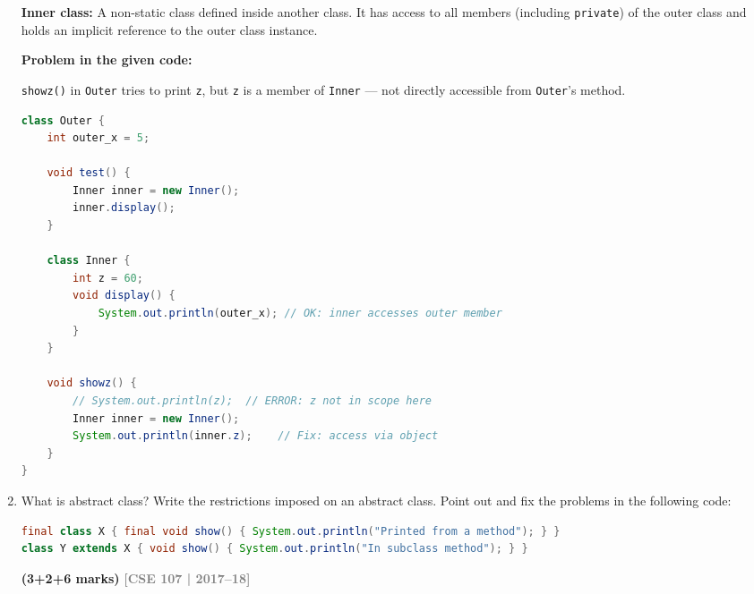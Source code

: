 \documentclass[12pt,a3paper]{article}
\newcommand{\yr}[1]{\hfill\textcolor{gray}{\small\textbf{[#1]}}}
\newcommand{\mk}[1]{\textcolor{orange!70!black}{\small\textbf{(#1 marks)}}}
\begin{document}
\begin{enumerate}
\begin{tcolorbox}[enhanced,breakable,ansbox,
  colback=cD!4,colframe=cD,boxrule=0.8pt,arc=5pt,
  title={\textbf{Answer --- Inner Class \& Problem in \texttt{Outer}/\texttt{Inner} Code}},
  fonttitle=\bfseries\color{white},colbacktitle=cD]

\textbf{Inner class:} A non-static class defined inside another class.
It has access to all members (including \texttt{private}) of the outer
class and holds an implicit reference to the outer class instance.

\medskip
\textbf{Problem in the given code:}

\texttt{showz()} in \texttt{Outer} tries to print \texttt{z}, but
\texttt{z} is a member of \texttt{Inner} --- not directly accessible
from \texttt{Outer}'s method.

\begin{lstlisting}[language=Java]
class Outer {
    int outer_x = 5;

    void test() {
        Inner inner = new Inner();
        inner.display();
    }

    class Inner {
        int z = 60;
        void display() {
            System.out.println(outer_x); // OK: inner accesses outer member
        }
    }

    void showz() {
        // System.out.println(z);  // ERROR: z not in scope here
        Inner inner = new Inner();
        System.out.println(inner.z);    // Fix: access via object
    }
}
\end{lstlisting}

\end{tcolorbox}

\item What is abstract class? Write the restrictions imposed on an abstract class. Point out and fix the problems in the following code:
\begin{lstlisting}[language=Java]
final class X { final void show() { System.out.println("Printed from a method"); } }
class Y extends X { void show() { System.out.println("In subclass method"); } }
\end{lstlisting}
\mk{3+2+6}
\yr{CSE 107 | 2017--18}

\begin{tcolorbox}[enhanced,breakable,ansbox,
  colback=cD!4,colframe=cD,boxrule=0.8pt,arc=5pt,
  title={\textbf{Answer --- Abstract Class Restrictions \& Fix}},
  fonttitle=\bfseries\color{white},colbacktitle=cD]


\end{tcolorbox}
\end{enumerate}
\end{document}
